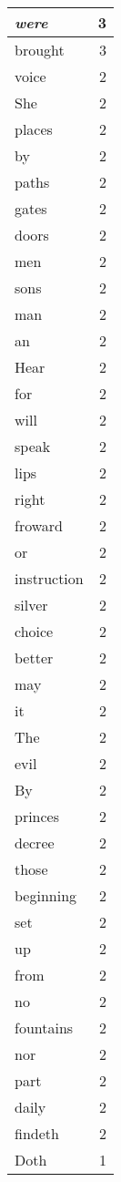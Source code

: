 \begin{center}
\begin{longtable}{l|r}
\emph{were} & 3\\ \hline 
brought & 3\\ \hline 
voice & 2\\ \hline 
She & 2\\ \hline 
places & 2\\ \hline 
by & 2\\ \hline 
paths & 2\\ \hline 
gates & 2\\ \hline 
doors & 2\\ \hline 
men & 2\\ \hline 
sons & 2\\ \hline 
man & 2\\ \hline 
an & 2\\ \hline 
Hear & 2\\ \hline 
for & 2\\ \hline 
will & 2\\ \hline 
speak & 2\\ \hline 
lips & 2\\ \hline 
right & 2\\ \hline 
froward & 2\\ \hline 
or & 2\\ \hline 
instruction & 2\\ \hline 
silver & 2\\ \hline 
choice & 2\\ \hline 
better & 2\\ \hline 
may & 2\\ \hline 
it & 2\\ \hline 
The & 2\\ \hline 
evil & 2\\ \hline 
By & 2\\ \hline 
princes & 2\\ \hline 
decree & 2\\ \hline 
those & 2\\ \hline 
beginning & 2\\ \hline 
set & 2\\ \hline 
up & 2\\ \hline 
from & 2\\ \hline 
no & 2\\ \hline 
fountains & 2\\ \hline 
nor & 2\\ \hline 
part & 2\\ \hline 
daily & 2\\ \hline 
findeth & 2\\ \hline 
Doth & 1\\ \hline 

\end{longtable}
\end{center}
